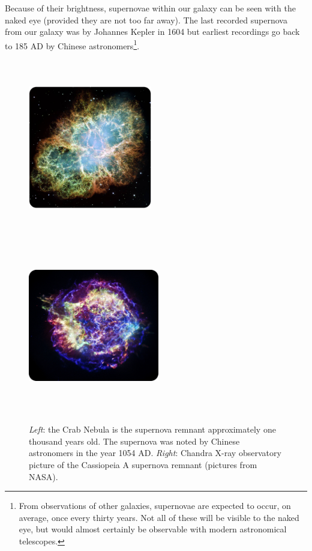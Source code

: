 Because of their brightness, supernovae within our galaxy can be seen with the naked eye (provided they are not too far away). The last recorded supernova from our galaxy was by Johannes Kepler in 1604 but earliest recordings go back to 185 AD by Chinese astronomers\footnote{From observations of other galaxies, supernovae are expected to occur, on average, once every thirty years. Not all of these will be visible to the naked eye, but would almost certainly be observable with modern astronomical telescopes.}.
\begin{figure}
\centering
\includegraphics[width=0.48\textwidth,height=7.7cm]{chapter3/img/crabnebula_rounded.jpg}
\includegraphics[width=0.51\textwidth,height=7.7cm]{chapter3/img/casa_rounded_resized.jpg}
\caption{\textit{Left}: the Crab Nebula is the supernova remnant approximately one thousand years old. The supernova was noted by Chinese astronomers in the year 1054 AD. \textit{Right}: Chandra X-ray observatory picture of the Cassiopeia A supernova remnant (pictures from NASA).}
\label{fig:supernova}
\end{figure}
\newline
